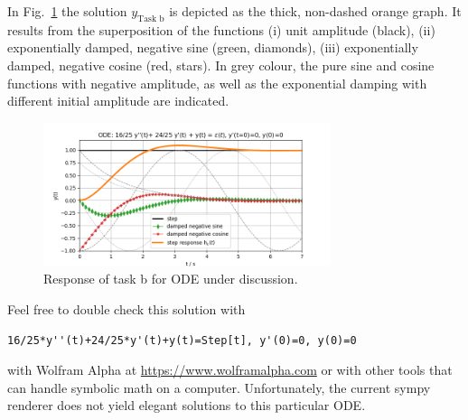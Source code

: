 \documentclass[a4paper,11pt,oneside]{scrartcl}
\begin{document}
In Fig.~\ref{fig:step_response_parts} the solution $y_\text{Task b}$ is depicted
as the thick, non-dashed orange graph. It results from the superposition of the
functions
(i) unit amplitude (black),
(ii) exponentially damped, negative sine (green, diamonds),
(iii) exponentially damped, negative cosine (red, stars).
In grey colour, the pure sine and cosine functions with negative amplitude,
as well as the exponential
damping with different initial amplitude are indicated.

\begin{figure}[h!]
\centering
\includegraphics[width=0.75\textwidth]{step_response_parts}
\caption{Response of task b for ODE under discussion.}
\label{fig:step_response_parts}
\end{figure}

Feel free to double check this solution with
\begin{verbatim}
16/25*y''(t)+24/25*y'(t)+y(t)=Step[t], y'(0)=0, y(0)=0
\end{verbatim}
with Wolfram Alpha at \url{https://www.wolframalpha.com} or with other tools
that can handle symbolic math on a computer. Unfortunately, the current sympy
renderer does not yield elegant solutions to this particular ODE.
\end{document}
